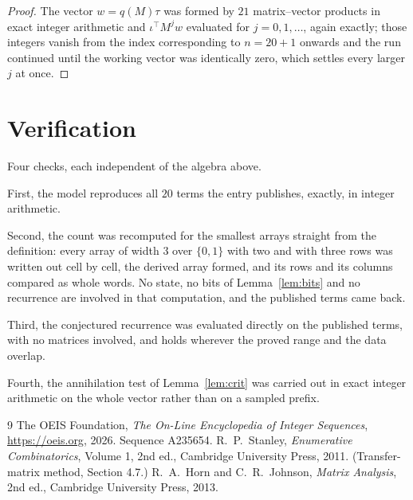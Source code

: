 \documentclass[11pt,a4paper]{article}
\theoremstyle{plain}
\theoremstyle{definition}
\begin{document}
\begin{proof}
The vector $w=q(M)\tau$ was formed by $21$ matrix--vector products in exact integer
arithmetic and $\iota^{\!\top}M^{j}w$ evaluated for $j=0,1,\dots$, again exactly; those
integers vanish from the index corresponding to $n=20+1$ onwards and the run continued
until the working vector was identically zero, which settles every larger $j$ at once.
\end{proof}

\section{Verification}

Four checks, each independent of the algebra above.

First, the model reproduces all $20$ terms the entry publishes, exactly, in integer
arithmetic.

Second, the count was recomputed for the smallest arrays straight from the definition: every
array of width $3$ over $\{0,1\}$ with two and with three rows was written out cell by cell,
the derived array formed, and its rows and its columns compared as whole words. No state, no
bits of Lemma~\ref{lem:bits} and no recurrence are involved in that computation, and the
published terms came back.

Third, the conjectured recurrence was evaluated directly on the published terms, with no
matrices involved, and holds wherever the proved range and the data overlap.

Fourth, the annihilation test of Lemma~\ref{lem:crit} was carried out in exact integer
arithmetic on the whole vector rather than on a sampled prefix.

\begin{thebibliography}{9}
 The OEIS Foundation, \emph{The On-Line Encyclopedia of Integer
Sequences}, \url{https://oeis.org}, 2026. Sequence A235654.
 R.~P.~Stanley, \emph{Enumerative Combinatorics}, Volume 1, 2nd ed.,
Cambridge University Press, 2011. (Transfer-matrix method, Section 4.7.)
 R.~A.~Horn and C.~R.~Johnson, \emph{Matrix Analysis}, 2nd ed., Cambridge
University Press, 2013.
\end{thebibliography}
\end{document}
